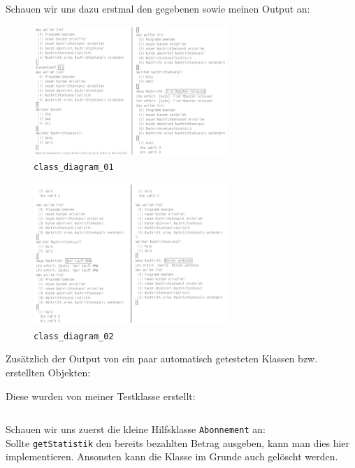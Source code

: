 \documentclass{article}
\begin{document}
\begin{enumerate}[label=\alph*.]
        Schauen wir uns dazu erstmal den gegebenen sowie meinen Output an:

        \begin{figure}[ht]
            \centering
            \includegraphics[width=0.65\textwidth]{class_diagram.jpg}
            \caption{\texttt{class\_diagram\_01}}
        \end{figure}

        \begin{figure}[ht]
            \centering
            \includegraphics[width=0.65\textwidth]{class_diagram.png}
            \caption{\texttt{class\_diagram\_02}}
        \end{figure}

        \newpage

        \newpage
        Zusätzlich der Output von ein paar automatisch getesteten Klassen bzw. erstellten Objekten:


        \newpage
        Diese wurden von meiner Testklasse erstellt:
        \inputminted{java}{Test.java}

        Schauen wir uns zuerst die kleine Hilfsklasse \texttt{Abonnement} an:\\
        Sollte \texttt{getStatistik} den bereits bezahlten Betrag ausgeben, kann man dies hier implementieren.
        Ansonsten kann die Klasse im Grunde auch gelöscht werden.
        \inputminted{java}{Abonnement.java}


\end{enumerate}
\end{document}
